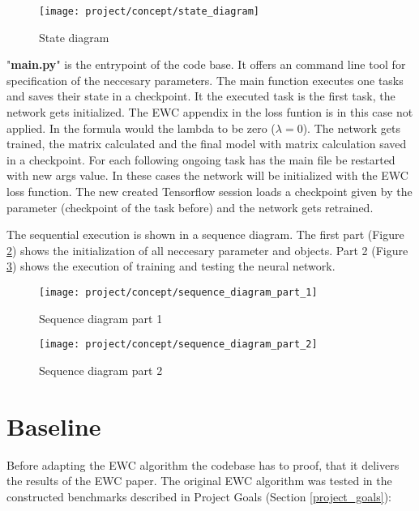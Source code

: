 \begin{figure}[H]
    \centering
    \texttt{[image: project/concept/state\_diagram]}
    \caption{State diagram}
    \label{fig:concept_state_diagram}
\end{figure}

"\textbf{main.py}" is the entrypoint of the code base.
It offers an command line tool for specification of the neccesary parameters.
\newline
The main function executes one tasks and saves their state in a checkpoint.
It the executed task is the first task, the network gets initialized.
The EWC appendix in the loss funtion is in this case not applied.
In the formula would the lambda to be zero ($\lambda = 0$).
The network gets trained, the matrix calculated and the final model with matrix calculation saved in a checkpoint.
For each following ongoing task has the main file be restarted with new args value.
In these cases the network will be initialized with the EWC loss function.
The new created Tensorflow session loads a checkpoint given by the parameter (checkpoint of the task before) and the network gets retrained.

The sequential execution is shown in a sequence diagram.
The first part (Figure \ref{fig:concept_sequence_diagram_part_1}) shows the initialization of all neccesary parameter and objects.
Part 2 (Figure \ref{fig:concept_sequence_diagram_part_2}) shows the execution of training and testing the neural network.

\begin{figure}[H]
    \centering
    \texttt{[image: project/concept/sequence\_diagram\_part\_1]}
    \caption{Sequence diagram part 1}
    \label{fig:concept_sequence_diagram_part_1}
\end{figure}

\begin{figure}[H]
    \centering
    \texttt{[image: project/concept/sequence\_diagram\_part\_2]}
    \caption{Sequence diagram part 2}
    \label{fig:concept_sequence_diagram_part_2}
\end{figure}

\newpage
\section{Baseline}

Before adapting the EWC algorithm the codebase has to proof, that it delivers the results of the EWC paper.
The original EWC algorithm was tested in the constructed benchmarks described in Project Goals (Section \ref{project_goals}):

